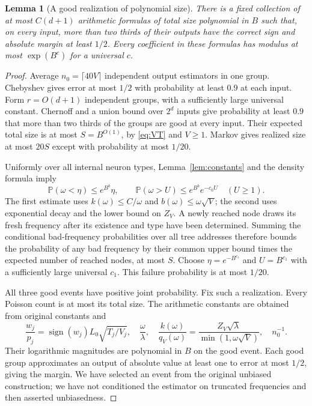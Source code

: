 \documentclass[11pt]{article}
\newtheorem{lemma}[theorem]{Lemma}
\theoremstyle{remark}\newtheorem{remark}[theorem]{Remark}
\newcommand{\Prb}{\mathbb P}
\newcommand{\sign}{\operatorname{sign}}
\begin{document}
\begin{lemma}[A good realization of polynomial size]
\label{lem:realization}
There is a fixed collection of at most $C(d+1)$ arithmetic formulas
of total size polynomial in $B$ such that, on every input, more than
two thirds of their outputs have the correct sign and absolute margin
at least $1/2$. Every coefficient in these formulas has modulus at most
$\exp(B^c)$ for a universal $c$.
\end{lemma}
\begin{proof}
Average $n_0=\lceil40V\rceil$ independent output estimators in
one group. Chebyshev gives error at most $1/2$ with probability at
least $0.9$ at each input. Form $r=O(d+1)$ independent groups, with
a sufficiently large universal constant. Chernoff and a union bound
over $2^d$ inputs give probability at least $0.9$ that more than two
thirds of the groups are good at every input. Their expected total
size is at most $S=B^{O(1)}$, by \eqref{eq:VT} and $V\ge1$.
Markov gives realized size at most $20S$ except with probability
at most $1/20$.

Uniformly over all internal neuron types, Lemma~\ref{lem:constants}
and the density formula imply
\[
 \Prb(\omega<\eta)\le e^{B^b}\eta,\qquad
 \Prb(\omega>U)\le e^{B^b}e^{-c_0U}\quad(U\ge1).
\]
The first estimate uses $k(\omega)\le C/\omega$ and
$b(\omega)\le\omega\sqrt V$; the second uses exponential decay
and the lower bound on $Z_V$. A newly reached node draws its fresh
frequency after its existence and type have been determined. Summing
the conditional bad-frequency probabilities over all tree addresses
therefore bounds the probability of any bad frequency by their common
upper bound times the expected number of reached nodes, at most $S$.
Choose $\eta=e^{-B^{c_1}}$ and $U=B^{c_1}$ with a sufficiently large
universal $c_1$. This failure probability is at most $1/20$.

All three good events have positive joint probability. Fix such a
realization. Every Poisson count is at most its total size. The
arithmetic constants are obtained from original constants and
\[
 \frac{w_j}{p_j}=\sign(w_j)L_0\sqrt{T_j/V_j},\quad
 \frac\omega\lambda,\quad
 \frac{k(\omega)}{q_V(\omega)}
       =\frac{Z_V\sqrt\lambda}{\min(1,\omega\sqrt V)},\quad
 n_0^{-1}.
\]
Their logarithmic magnitudes are polynomial in $B$ on the good event.
Each good group approximates an output of absolute value at least one
to error at most $1/2$, giving the margin. We have selected an event
from the original unbiased construction; we have not conditioned the
estimator on truncated frequencies and then asserted unbiasedness.
\end{proof}
\end{document}
